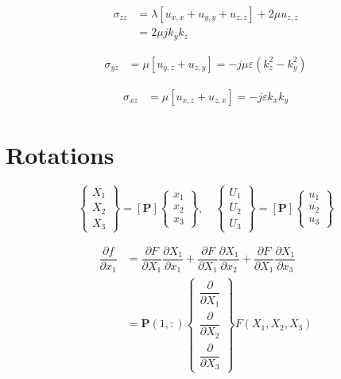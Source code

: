 \documentclass[11pt,A4paper]{book}
\newcommand{\tb}{\textbf}
\newcommand{\esp}{, \quad}
\newcommand{\p}{\partial}
\renewcommand{\:}{\tb{:}}
\newcommand{\eps}{\varepsilon}
\begin{document}
\begin{align}
	\sigma_{zz}&=\lambda\left[
	u_{x,x}+u_{y,y}+u_{z,z}
	\right]+2\mu u_{z,z}\\
	&=2\mu jk_yk_z
\end{align}

\begin{align}
	\sigma_{yz}&=\mu \left[ u_{y,z}+u_{z,y}\right]=-j\mu\eps (k_z^2-k_y^2)
\end{align}


\begin{align}
	\sigma_{xz}&=\mu \left[ u_{x,z}+u_{z,x}\right]=-j\eps k_xk_y
\end{align}


\chapter{Rotations}


\begin{equation}
	\begin{Bmatrix}
		X_1\\
		X_2\\
		X_3
	\end{Bmatrix}=[\tb{P}]	\begin{Bmatrix}
		x_1\\
		x_2\\
		x_3
	\end{Bmatrix}\esp
	\begin{Bmatrix}
		U_1\\
		U_2\\
		U_3
	\end{Bmatrix}=[\tb{P}]	\begin{Bmatrix}
		u_1\\
		u_2\\
		u_3
	\end{Bmatrix}	
\end{equation}

\begin{align}
\dfrac{\p f}{\p x_1}&=	\dfrac{\p F}{\p X_1}\dfrac{\p X_1}{\p x_1}+\dfrac{\p F}{\p X_1}\dfrac{\p X_1}{\p x_2}+
\dfrac{\p F}{\p X_1}\dfrac{\p X_1}{\p x_3}\\
&=
\tb{P}(1,:)\begin{Bmatrix}
	\dfrac{\p }{\p X_1}\\
	\dfrac{\p }{\p X_2}\\
	\dfrac{\p }{\p X_3}
\end{Bmatrix}F(X_1,X_2,X_3)
\end{align}
\end{document}
